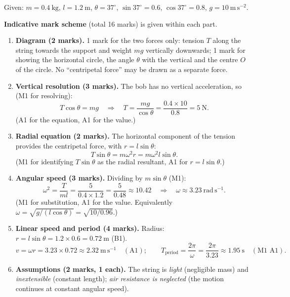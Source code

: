 \documentclass[11pt]{article}
\newcommand{\legende}[1]{\par\vspace{6pt}{\popsemi\fontsize{9}{11.5}\selectfont\color{popmuted}#1}}
\begin{document}
\begin{corrige}
Given: $m = 0.4\ \mathrm{kg}$, $l = 1.2\ \mathrm{m}$, $\theta = 37^{\circ}$, $\sin 37^{\circ} = 0.6$, $\cos 37^{\circ} = 0.8$, $g = 10\ \mathrm{m\,s^{-2}}$.

\textbf{Indicative mark scheme} (total 16 marks) is given within each part.
\begin{enumerate}
\item \textbf{Diagram (2 marks).} 1 mark for the two forces only: tension $T$ along the string towards the support and weight $mg$ vertically downwards; 1 mark for showing the horizontal circle, the angle $\theta$ with the vertical and the centre $O$ of the circle. No ``centripetal force'' may be drawn as a separate force.
\begin{popfigure}
\legende{Forces on the bob of a conical pendulum.}
\end{popfigure}
\item \textbf{Vertical resolution (3 marks).} The bob has no vertical acceleration, so (M1 for resolving):
\[ T\cos\theta = mg \quad\Longrightarrow\quad T = \frac{mg}{\cos\theta} = \frac{0.4\times 10}{0.8} = 5\ \mathrm{N}. \]
(A1 for the equation, A1 for the value.)
\item \textbf{Radial equation (2 marks).} The horizontal component of the tension provides the centripetal force, with $r = l\sin\theta$:
\[ T\sin\theta = m\omega^{2}r = m\omega^{2}l\sin\theta. \]
(M1 for identifying $T\sin\theta$ as the radial resultant, A1 for $r = l\sin\theta$.)
\item \textbf{Angular speed (3 marks).} Dividing by $m\sin\theta$ (M1):
\[ \omega^{2} = \frac{T}{ml} = \frac{5}{0.4\times 1.2} = \frac{5}{0.48} \approx 10.42 \quad\Longrightarrow\quad \omega \approx 3.23\ \mathrm{rad\,s^{-1}}. \]
(M1 for substitution, A1 for the value. Equivalently $\omega = \sqrt{g/(l\cos\theta)} = \sqrt{10/0.96}$.)
\item \textbf{Linear speed and period (4 marks).} Radius: $r = l\sin\theta = 1.2\times 0.6 = 0.72\ \mathrm{m}$ (B1).
\[ v = \omega r = 3.23\times 0.72 \approx 2.32\ \mathrm{m\,s^{-1}} \quad (\text{A1}); \qquad T_{\text{period}} = \frac{2\pi}{\omega} = \frac{2\pi}{3.23} \approx 1.95\ \mathrm{s} \quad (\text{M1 A1}). \]
\item \textbf{Assumptions (2 marks, 1 each).} The string is \emph{light} (negligible mass) and \emph{inextensible} (constant length); \emph{air resistance is neglected} (the motion continues at constant angular speed).
\end{enumerate}
\end{corrige}
\end{document}
